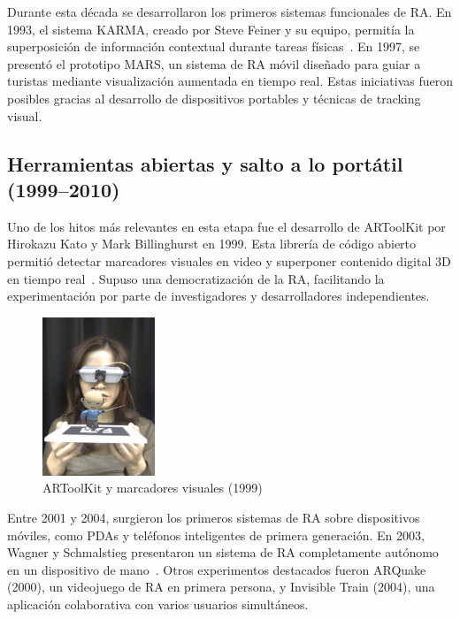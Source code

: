 Durante esta década se desarrollaron los primeros sistemas funcionales de RA. En 1993, el sistema KARMA, creado por Steve Feiner y su equipo, permitía la superposición de información contextual durante tareas físicas~\cite{feiner1993}. En 1997, se presentó el prototipo MARS, un sistema de RA móvil diseñado para guiar a turistas mediante visualización aumentada en tiempo real. Estas iniciativas fueron posibles gracias al desarrollo de dispositivos portables y técnicas de tracking visual.

\subsection*{Herramientas abiertas y salto a lo portátil (1999–2010)}
Uno de los hitos más relevantes en esta etapa fue el desarrollo de ARToolKit por Hirokazu Kato y Mark Billinghurst en 1999. Esta librería de código abierto permitió detectar marcadores visuales en video y superponer contenido digital 3D en tiempo real~\cite{kato1999}. Supuso una democratización de la RA, facilitando la experimentación por parte de investigadores y desarrolladores independientes.

\begin{figure}[H]
    \centering
    \includegraphics[width=0.3\textwidth]{figs/artoolkit.jpg}
    \caption{ARToolKit y marcadores visuales (1999)}
    \label{fig:artoolkit}
\end{figure}

Entre 2001 y 2004, surgieron los primeros sistemas de RA sobre dispositivos móviles, como PDAs y teléfonos inteligentes de primera generación. En 2003, Wagner y Schmalstieg presentaron un sistema de RA completamente autónomo en un dispositivo de mano~\cite{wagner2003}. Otros experimentos destacados fueron ARQuake (2000), un videojuego de RA en primera persona, y Invisible Train (2004), una aplicación colaborativa con varios usuarios simultáneos.


